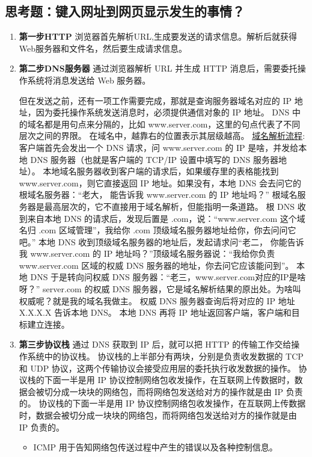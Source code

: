 \documentclass[11pt]{article}
\begin{document}
\subsection{思考题：键入网址到网页显示发生的事情？}
\label{sec:orga99b5a4}
\begin{enumerate}
\item \textbf{第一步HTTP}
浏览器首先解析URL,生成要发送的请求信息。解析后就获得Web服务器和文件名，然后要生成请求信息。
\item \textbf{第二步DNS服务器}
通过浏览器解析 URL 并生成 HTTP 消息后，需要委托操作系统将消息发送给 Web 服务器。

但在发送之前，还有一项工作需要完成，那就是查询服务器域名对应的 IP 地址，因为委托操作系统发送消息时，必须提供通信对象的 IP 地址。
DNS 中的域名都是用句点来分隔的，比如 www.server.com，这里的句点代表了不同层次之间的界限。
在域名中，越靠右的位置表示其层级越高。
\uline{域名解析流程}:
客户端首先会发出一个 DNS 请求，问 www.server.com 的 IP 是啥，并发给本地 DNS 服务器（也就是客户端的 TCP/IP 设置中填写的 DNS 服务器地址）。
本地域名服务器收到客户端的请求后，如果缓存里的表格能找到 www.server.com，则它直接返回 IP 地址。如果没有，本地 DNS 会去问它的根域名服务器：“老大， 能告诉我 www.server.com 的 IP 地址吗？” 根域名服务器是最高层次的，它不直接用于域名解析，但能指明一条道路。
根 DNS 收到来自本地 DNS 的请求后，发现后置是 .com，说：“www.server.com 这个域名归 .com 区域管理”，我给你 .com 顶级域名服务器地址给你，你去问问它吧。”
本地 DNS 收到顶级域名服务器的地址后，发起请求问“老二， 你能告诉我 www.server.com 的 IP 地址吗？”顶级域名服务器说：“我给你负责 www.server.com 区域的权威 DNS 服务器的地址，你去问它应该能问到”。
本地 DNS 于是转向问权威 DNS 服务器：“老三，www.server.com对应的IP是啥呀？” server.com 的权威 DNS 服务器，它是域名解析结果的原出处。为啥叫权威呢？就是我的域名我做主。
权威 DNS 服务器查询后将对应的 IP 地址 X.X.X.X 告诉本地 DNS。
本地 DNS 再将 IP 地址返回客户端，客户端和目标建立连接。
\item \textbf{第三步协议栈}
通过 DNS 获取到 IP 后，就可以把 HTTP 的传输工作交给操作系统中的协议栈。
协议栈的上半部分有两块，分别是负责收发数据的 TCP 和 UDP 协议，这两个传输协议会接受应用层的委托执行收发数据的操作。
协议栈的下面一半是用 IP 协议控制网络包收发操作，在互联网上传数据时，数据会被切分成一块块的网络包，而将网络包发送给对方的操作就是由 IP 负责的。
协议栈的下面一半是用 IP 协议控制网络包收发操作，在互联网上传数据时，数据会被切分成一块块的网络包，而将网络包发送给对方的操作就是由 IP 负责的。
\begin{itemize}
\item ICMP 用于告知网络包传送过程中产生的错误以及各种控制信息。

\end{itemize}
\end{enumerate}
\end{document}
